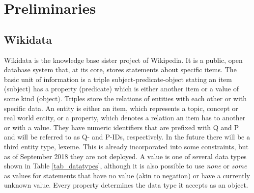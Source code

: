 \documentclass[hyperref,bachelorofscience,fleqn]{cgvpub}
\begin{document}
\chapter{Preliminaries}\label{cha_preliminaries}
\section{Wikidata}\label{sec_wikidata}
Wikidata is the knowledge base sister project of Wikipedia. It is a public, open database system that, at its core, stores statements about specific items. The basic unit of information is a triple subject-predicate-object stating an item (subject) has a property (predicate) which is either another item or a value of some kind (object). Triples store the relations of entities with each other or with specific data. An entity is either an item, which represents a topic, concept or real world entity, or a property, which denotes a relation an item has to another or with a value. They have numeric identifiers that are prefixed with Q and P and will be referred to as Q- and P-IDs, respectively. In the future there will be a third entity type, lexeme. This is already incorporated into some constraints, but as of September 2018 they are not deployed. A value is one of several data types shown in Table \ref{tab_datatypes}, although it is also possible to use \emph{none} or \emph{some} as values for statements that have no value (akin to negation) or have a currently unknown value. Every property determines the data type it accepts as an object. \\
\end{document}
